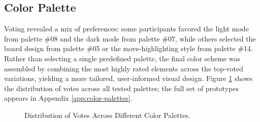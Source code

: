\subsection{Color Palette}
\label{subsec:results-color-palette}
Voting revealed a mix of preferences: some participants favored the light mode from palette \#08 and the dark mode from palette \#07, while others selected the board design from palette \#05 or the move-highlighting style from palette \#14. \\

Rather than selecting a single predefined palette, the final color scheme was assembled by combining the most highly rated elements across the top-voted variations, yielding a more tailored, user-informed visual design. Figure \ref{fig:color-palette-results} shows the distribution of votes across all tested palettes; the full set of prototypes appears in Appendix \ref{app:color-palettes}.

\begin{figure}[h!]
\centering
{}
\caption[Votes per color palette]{Distribution of Votes Across Different Color Palettes.}
\label{fig:color-palette-results}
\end{figure}
